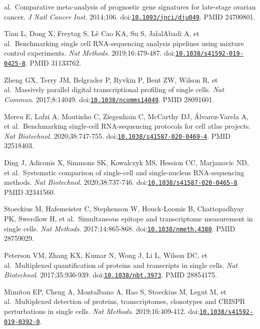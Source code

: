 \documentclass[11pt]{article}
\begin{document}
\begin{enumerate}[label={[\arabic*]},leftmargin=2.6em,labelsep=0.5em,itemsep=1.5pt]
  al.~Comparative meta-analysis of prognostic gene signatures for
  late-stage ovarian cancer. \emph{J Natl Cancer Inst}. 2014;106.
  doi:\href{https://doi.org/10.1093/jnci/dju049}{\nolinkurl{10.1093/jnci/dju049}}.
  PMID 24700801.
\item
  Tian L, Dong X, Freytag S, Lê Cao KA, Su S, JalalAbadi A, et
  al.~Benchmarking single cell RNA-sequencing analysis pipelines using
  mixture control experiments. \emph{Nat Methods}. 2019;16:479-487.
  doi:\href{https://doi.org/10.1038/s41592-019-0425-8}{\nolinkurl{10.1038/s41592-019-0425-8}}.
  PMID 31133762.
\item
  Zheng GX, Terry JM, Belgrader P, Ryvkin P, Bent ZW, Wilson R, et
  al.~Massively parallel digital transcriptional profiling of single
  cells. \emph{Nat Commun}. 2017;8:14049.
  doi:\href{https://doi.org/10.1038/ncomms14049}{\nolinkurl{10.1038/ncomms14049}}.
  PMID 28091601.
\item
  Mereu E, Lafzi A, Moutinho C, Ziegenhain C, McCarthy DJ,
  Álvarez-Varela A, et al.~Benchmarking single-cell RNA-sequencing
  protocols for cell atlas projects. \emph{Nat Biotechnol}.
  2020;38:747-755.
  doi:\href{https://doi.org/10.1038/s41587-020-0469-4}{\nolinkurl{10.1038/s41587-020-0469-4}}.
  PMID 32518403.
\item
  Ding J, Adiconis X, Simmons SK, Kowalczyk MS, Hession CC, Marjanovic
  ND, et al.~Systematic comparison of single-cell and single-nucleus
  RNA-sequencing methods. \emph{Nat Biotechnol}. 2020;38:737-746.
  doi:\href{https://doi.org/10.1038/s41587-020-0465-8}{\nolinkurl{10.1038/s41587-020-0465-8}}.
  PMID 32341560.
\item
  Stoeckius M, Hafemeister C, Stephenson W, Houck-Loomis B,
  Chattopadhyay PK, Swerdlow H, et al.~Simultaneous epitope and
  transcriptome measurement in single cells. \emph{Nat Methods}.
  2017;14:865-868.
  doi:\href{https://doi.org/10.1038/nmeth.4380}{\nolinkurl{10.1038/nmeth.4380}}.
  PMID 28759029.
\item
  Peterson VM, Zhang KX, Kumar N, Wong J, Li L, Wilson DC, et
  al.~Multiplexed quantification of proteins and transcripts in single
  cells. \emph{Nat Biotechnol}. 2017;35:936-939.
  doi:\href{https://doi.org/10.1038/nbt.3973}{\nolinkurl{10.1038/nbt.3973}}. PMID
  28854175.
\item
  Mimitou EP, Cheng A, Montalbano A, Hao S, Stoeckius M, Legut M, et
  al.~Multiplexed detection of proteins, transcriptomes, clonotypes and
  CRISPR perturbations in single cells. \emph{Nat Methods}.
  2019;16:409-412.
  doi:\href{https://doi.org/10.1038/s41592-019-0392-0}{\nolinkurl{10.1038/s41592-019-0392-0}}.

\end{enumerate}
\end{document}
